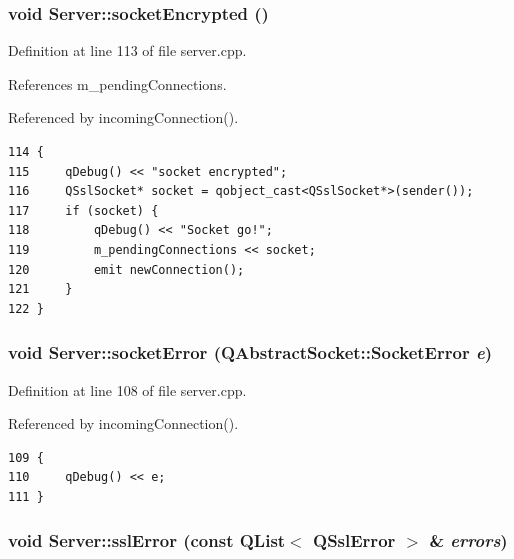 \subsubsection{\setlength{\rightskip}{0pt plus 5cm}void Server::socketEncrypted ()\hspace{0.3cm}{\tt  [protected, slot]}}\label{classServer_17ef0c2d5e62f72698a1fbcf37ca0d16}




Definition at line 113 of file server.cpp.

References m\_\-pendingConnections.

Referenced by incomingConnection().

\begin{Code}\begin{verbatim}114 {
115     qDebug() << "socket encrypted";
116     QSslSocket* socket = qobject_cast<QSslSocket*>(sender());
117     if (socket) {
118         qDebug() << "Socket go!";
119         m_pendingConnections << socket;
120         emit newConnection();
121     }
122 }
\end{verbatim}
\end{Code}


\subsubsection{\setlength{\rightskip}{0pt plus 5cm}void Server::socketError (QAbstractSocket::SocketError {\em e})\hspace{0.3cm}{\tt  [protected, slot]}}\label{classServer_316c33865d07fee74e6b9520a26a243a}




Definition at line 108 of file server.cpp.

Referenced by incomingConnection().

\begin{Code}\begin{verbatim}109 {
110     qDebug() << e;
111 }
\end{verbatim}
\end{Code}


\subsubsection{\setlength{\rightskip}{0pt plus 5cm}void Server::sslError (const QList$<$ QSslError $>$ \& {\em errors})\hspace{0.3cm}{\tt  [protected, slot]}}\label{classServer_87fd0cda05a134e8baad67905e4b371b}




